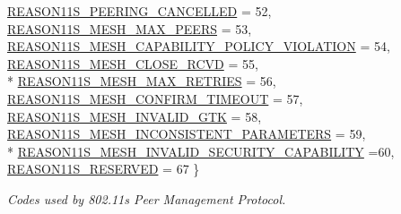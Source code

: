 \begin{DoxyCompactItemize}
\hyperlink{group__dot11s_gga1132ec5975c87960ceb86ea54481aba6ab7a7fcea22d68ba038856480ea34fdd8}{R\+E\+A\+S\+O\+N11\+S\+\_\+\+P\+E\+E\+R\+I\+N\+G\+\_\+\+C\+A\+N\+C\+E\+L\+L\+ED} = 52, 
\hyperlink{group__dot11s_gga1132ec5975c87960ceb86ea54481aba6ab70ebebb2518212636d97aa78a083169}{R\+E\+A\+S\+O\+N11\+S\+\_\+\+M\+E\+S\+H\+\_\+\+M\+A\+X\+\_\+\+P\+E\+E\+RS} = 53, 
\hyperlink{group__dot11s_gga1132ec5975c87960ceb86ea54481aba6aae9441b25fc7316ae53a6e73398521e5}{R\+E\+A\+S\+O\+N11\+S\+\_\+\+M\+E\+S\+H\+\_\+\+C\+A\+P\+A\+B\+I\+L\+I\+T\+Y\+\_\+\+P\+O\+L\+I\+C\+Y\+\_\+\+V\+I\+O\+L\+A\+T\+I\+ON} = 54, 
\hyperlink{group__dot11s_gga1132ec5975c87960ceb86ea54481aba6a66a9d95025c42e4e00d49efa6ece82a3}{R\+E\+A\+S\+O\+N11\+S\+\_\+\+M\+E\+S\+H\+\_\+\+C\+L\+O\+S\+E\+\_\+\+R\+C\+VD} = 55, 
\\*
\hyperlink{group__dot11s_gga1132ec5975c87960ceb86ea54481aba6ab4a78ee9f92e1a9644447dc6d895f317}{R\+E\+A\+S\+O\+N11\+S\+\_\+\+M\+E\+S\+H\+\_\+\+M\+A\+X\+\_\+\+R\+E\+T\+R\+I\+ES} = 56, 
\hyperlink{group__dot11s_gga1132ec5975c87960ceb86ea54481aba6adb681bf7add7cb193a7e9b3e0147875c}{R\+E\+A\+S\+O\+N11\+S\+\_\+\+M\+E\+S\+H\+\_\+\+C\+O\+N\+F\+I\+R\+M\+\_\+\+T\+I\+M\+E\+O\+UT} = 57, 
\hyperlink{group__dot11s_gga1132ec5975c87960ceb86ea54481aba6a992af53cebe30af98c1acc0054bb7bae}{R\+E\+A\+S\+O\+N11\+S\+\_\+\+M\+E\+S\+H\+\_\+\+I\+N\+V\+A\+L\+I\+D\+\_\+\+G\+TK} = 58, 
\hyperlink{group__dot11s_gga1132ec5975c87960ceb86ea54481aba6a98ddea6f69878fdde8dba52112bdd96d}{R\+E\+A\+S\+O\+N11\+S\+\_\+\+M\+E\+S\+H\+\_\+\+I\+N\+C\+O\+N\+S\+I\+S\+T\+E\+N\+T\+\_\+\+P\+A\+R\+A\+M\+E\+T\+E\+RS} = 59, 
\\*
\hyperlink{group__dot11s_gga1132ec5975c87960ceb86ea54481aba6aab89215a9518c367d4998f025fffa630}{R\+E\+A\+S\+O\+N11\+S\+\_\+\+M\+E\+S\+H\+\_\+\+I\+N\+V\+A\+L\+I\+D\+\_\+\+S\+E\+C\+U\+R\+I\+T\+Y\+\_\+\+C\+A\+P\+A\+B\+I\+L\+I\+TY} =60, 
\hyperlink{group__dot11s_gga1132ec5975c87960ceb86ea54481aba6a1e76395872503ccadd9cf008e325b3d8}{R\+E\+A\+S\+O\+N11\+S\+\_\+\+R\+E\+S\+E\+R\+V\+ED} = 67
 \}\begin{DoxyCompactList}\small\item\em Codes used by 802.\+11s Peer Management Protocol. \end{DoxyCompactList}
\end{DoxyCompactItemize}
